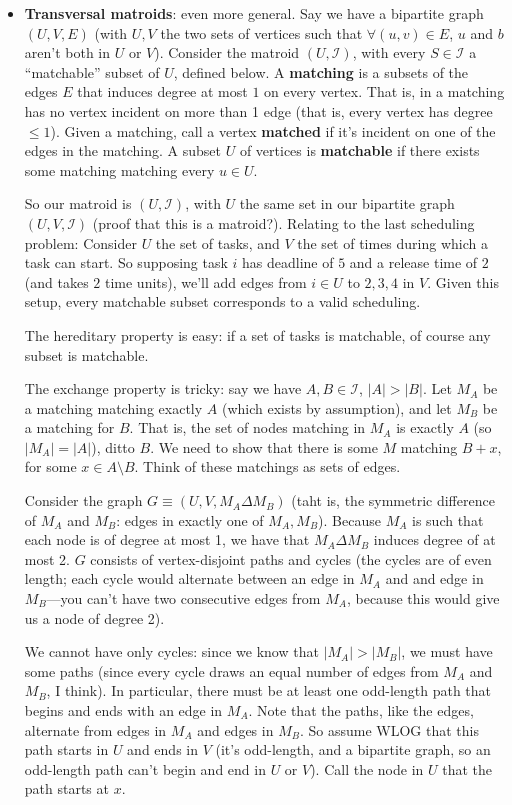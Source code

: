 \documentclass{article}
\begin{document}
\begin{itemize}
	\item
	\textbf{Transversal matroids}: even more general.
	Say we have a bipartite graph $(U,V,E)$ (with $U,V$ the two sets of
	vertices such that $\forall (u,v)\in E$, $u$ and $b$ aren't both in
	$U$ or $V$).
	Consider the matroid $(U,\mathcal I)$, with every $S\in\mathcal I$ a
	``matchable'' subset of $U$, defined below.
	A \textbf{matching} is a subsets of the edges $E$ that induces degree
	at most $1$ on every vertex.
	That is, in a matching has no vertex incident on more than 1 edge (that is,
	every vertex has degree $\leq 1$).
	Given a matching, call a vertex \textbf{matched} if it's incident
	on one of the edges in the matching.
	A subset $U$ of vertices is \textbf{matchable} if there exists some
	matching matching every $u\in U$.
	
	So our matroid is $(U,\mathcal I)$, with $U$ the same set in our
	bipartite graph $(U,V,\mathcal I)$ (proof that this is a matroid?).
	Relating to the last scheduling problem: Consider $U$ the set of
	tasks, and $V$ the set of times during which a task can start.
	So supposing task $i$ has deadline of $5$ and a release time of $2$ (and
	takes $2$ time units),
	we'll add edges from $i\in U$ to $2,3,4$ in $V$.
	Given this setup, every matchable subset corresponds to a valid
	scheduling.
	
	The hereditary property is easy: if a set of tasks is matchable,
	of course any subset is matchable.
	
	The exchange property is tricky: say we have $A,B\in\mathcal I$,
	$|A| > |B|$.
	Let $M_A$ be a matching matching exactly $A$ (which exists by assumption), 
	and
	let $M_B$ be a matching for $B$.
	That is, the set of nodes matching in $M_A$ is exactly $A$ (so
	$|M_A| = |A|$), ditto $B$.
	We need to show that there is some $M$ matching $B+x$, for some
	$x\in A\setminus B$.
	Think of these matchings as sets of edges.
	
	Consider the graph $G\equiv (U,V,M_A \Delta M_B)$ (taht is, the symmetric
	difference of $M_A$ and $M_B$: edges in exactly one of $M_A, M_B$).
	Because $M_A$ is such that each node is of degree at most 1, we
	have that $M_A\Delta M_B$ induces degree of at most 2.
	$G$ consists of vertex-disjoint paths and cycles (the cycles are of
	even length; each cycle would alternate between an edge in $M_A$ and
	and edge in $M_B$---you can't have two consecutive edges from $M_A$,
	because this would give us a node of degree 2).
	
	We cannot have only cycles: since we know that $|M_A| > |M_B|$, we must
	have some paths (since every cycle draws an equal number of
	edges from $M_A$ and $M_B$, I think).
	In particular, there must be at least one odd-length path that
	begins and ends with an edge in $M_A$.
	Note that the paths, like the edges, alternate from edges in
	$M_A$ and edges in $M_B$.
	So assume WLOG that this path starts in $U$ and ends in $V$ (it's
	odd-length, and a bipartite graph, so an odd-length path can't
	begin and end in $U$ or $V$).
	Call the node in $U$ that the path starts at $x$.
	

\end{itemize}
\end{document}
